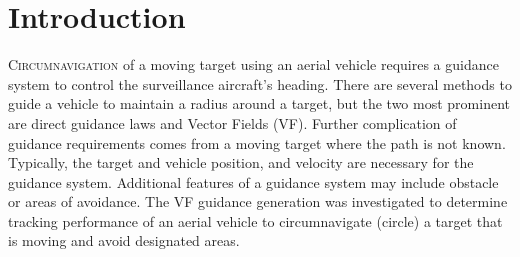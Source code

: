 \documentclass[conf]{new-aiaa}
\begin{document}
\section{Introduction}
\lettrine{C}{ircumnavigation} of a moving target using an aerial vehicle requires a guidance system to control the surveillance aircraft's heading. There are several methods to guide a vehicle to maintain a radius around a target, but the two most prominent are direct guidance laws and Vector Fields (VF). Further complication of guidance requirements comes from a moving target where the path is not known. Typically, the target and vehicle position, and velocity are necessary for the guidance system. Additional features of a guidance system may include obstacle or areas of avoidance. The VF guidance generation was investigated to determine tracking performance of an aerial vehicle to circumnavigate (circle) a target that is moving and avoid designated areas.
\end{document}

